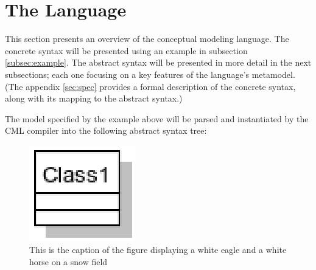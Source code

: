 \section{The Language}\label{sec:lang}
%
This section presents an overview of the conceptual modeling language.
The concrete syntax will be presented using an example in subsection \ref{subsec:example}.
The abstract syntax will be presented in more detail in the next subsections; each one focusing on a key features of the language's metamodel. (The appendix \ref{sec:spec} provides a formal description of the concrete syntax, along with its mapping to the abstract syntax.)



The model specified by the example above will be parsed and instantiated by the CML compiler into the following abstract syntax tree:

\label{fig:ast}
\begin{figure}
\centering
\includegraphics{language/main}
\caption{This is the caption of the figure displaying a white eagle and
a white horse on a snow field}
\end{figure}
